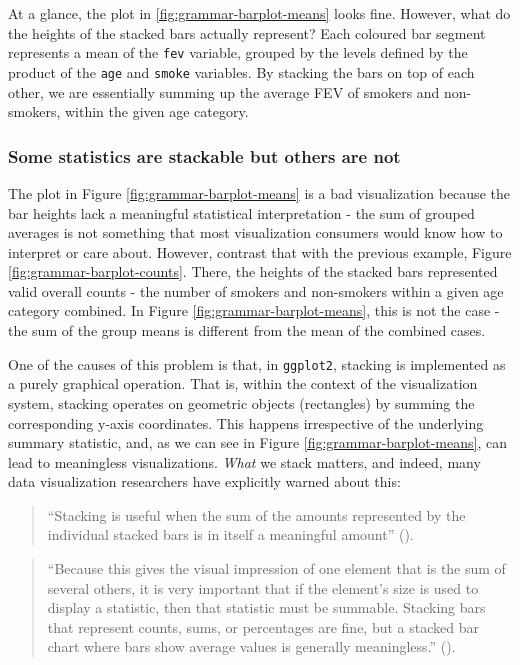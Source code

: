 \documentclass[
  openany]{book}
\theoremstyle{definition}
\theoremstyle{definition}
\theoremstyle{definition}
\theoremstyle{definition}
\theoremstyle{remark}
\begin{document}
At a glance, the plot in \ref{fig:grammar-barplot-means} looks fine. However, what do the heights of the stacked bars actually represent? Each coloured bar segment represents a mean of the \texttt{fev} variable, grouped by the levels defined by the product of the \texttt{age} and \texttt{smoke} variables. By stacking the bars on top of each other, we are essentially summing up the average FEV of smokers and non-smokers, within the given age category.

\subsubsection{Some statistics are stackable but others are not}\label{stackable-or-not}

The plot in Figure \ref{fig:grammar-barplot-means} is a bad visualization because the bar heights lack a meaningful statistical interpretation - the sum of grouped averages is not something that most visualization consumers would know how to interpret or care about. However, contrast that with the previous example, Figure \ref{fig:grammar-barplot-counts}. There, the heights of the stacked bars represented valid overall counts - the number of smokers and non-smokers within a given age category combined. In Figure \ref{fig:grammar-barplot-means}, this is not the case - the sum of the group means is different from the mean of the combined cases.

One of the causes of this problem is that, in \texttt{ggplot2}, stacking is implemented as a purely graphical operation. That is, within the context of the visualization system, stacking operates on geometric objects (rectangles) by summing the corresponding y-axis coordinates. This happens irrespective of the underlying summary statistic, and, as we can see in Figure \ref{fig:grammar-barplot-means}, can lead to meaningless visualizations. \emph{What} we stack matters, and indeed, many data visualization researchers have explicitly warned about this:

\begin{quote}
``Stacking is useful when the sum of the amounts represented by the individual stacked bars is in itself a meaningful amount'' ().
\end{quote}

\begin{quote}
``Because this gives the visual impression of one element that is the sum of several others, it is very important that if the element's size is used to display a statistic, then that statistic must be summable. Stacking bars that represent counts, sums, or percentages are fine, but a stacked bar chart where bars show average values is generally meaningless.'' ().
\end{quote}
\end{document}
